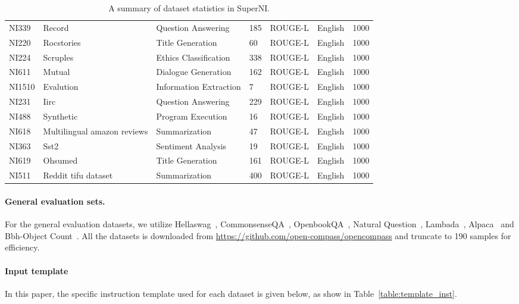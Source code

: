 \begin{table*}[]
\begin{center}
\begin{scriptsize}
\begin{tabular}{l|llllll}
NI339 & Record & Question Answering & 185 & ROUGE-L & English & 1000 \\
NI220 & Rocstories & Title Generation & 60 & ROUGE-L & English & 1000 \\
NI224 & Scruples & Ethics Classification & 338 & ROUGE-L & English & 1000 \\
NI611 & Mutual & Dialogue Generation & 162 & ROUGE-L & English & 1000 \\
NI1510 & Evalution & Information Extraction & 7 & ROUGE-L & English & 1000 \\
NI231 & Iirc & Question Answering & 229 & ROUGE-L & English & 1000 \\
NI488 & Synthetic & Program Execution & 16 & ROUGE-L & English & 1000 \\
NI618 & Multilingual amazon reviews & Summarization & 47 & ROUGE-L & English & 1000 \\
NI363 & Sst2 & Sentiment Analysis & 19 & ROUGE-L & English & 1000 \\
NI619 & Ohsumed & Title Generation & 161 & ROUGE-L & English & 1000 \\
NI511 & Reddit tifu dataset & Summarization & 400 & ROUGE-L & English & 1000 \\

\bottomrule
\end{tabular}
\caption{A summary of dataset statistics in SuperNI.}
\label{table:superni}
\end{scriptsize}
\end{center}
\end{table*}


\paragraph{General evaluation sets.} For the general evaluation datasets, we utilize Hellaswag~\citep{zellers2019hellaswag}, CommonsenseQA~\citep{talmor2018commonsenseqa}, OpenbookQA~\citep{mihaylov2018can}, Natural Question~\cite{kwiatkowski2019natural}, Lambada~\cite{paperno2016lambada}, Alpaca~\cite{taori2023alpaca} and Bbh-Object Count~\cite{srivastava2022beyond}. All the datasets is downloaded from \url{https://github.com/open-compass/opencompass} and truncate to 190 samples for efficiency.

\paragraph{Input template}
In this paper, the specific instruction template used for each dataset is given below, as show in Table~\ref{table:template_inst}.



